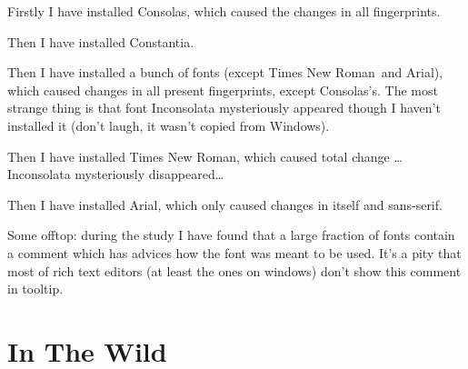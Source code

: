 \documentclass[letterpaper,14pt]{article}
\begin{document}
Firstly I have installed Consolas\texttrademark, which caused the changes in all fingerprints.



Then I have installed Constantia\texttrademark.



Then I have installed a bunch of fonts (except Times New Roman\texttrademark\ and Arial\texttrademark), which caused changes in all present fingerprints, except Consolas's\texttrademark. The most strange thing is that font Inconsolata mysteriously appeared though I haven't installed it (don't laugh, it wasn't copied from Windows\texttrademark).




Then I have installed Times New Roman\texttrademark, which caused total change \ldots{} Inconsolata mysteriously disappeared\ldots{}



Then I have installed Arial\texttrademark, which only caused changes in itself and sans-serif.



Some offtop: during the study I have found that a large fraction of fonts contain a comment which has advices how the font was meant to be used. It's a pity that most of rich text editors (at least the ones on windows) don't show this comment in tooltip.

\section{In The Wild}\label{in-the-wild}
\end{document}
